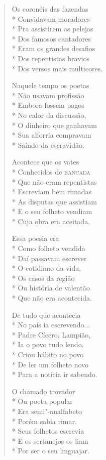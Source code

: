 \begin{verse}
Os coronéis das fazendas\\*
Convidavam moradores\\*
Pra assistirem as pelejas\\*
Dos famosos cantadores\\*
Eram os grandes desafios\\*
Dos repentistas bravios\\*
Dos versos mais multicores.

Naquele tempo os poetas\\*
Não usavam profissão\\*
Embora fossem pagos\\*
No calor da discussão,\\*
O dinheiro que ganhavam\\*
Sua alforria compravam\\*
Saindo da escravidão.

Acontece que os vates\\*
Conhecidos de \textsc{bancada}\\*
Que não eram repentistas\\*
Escreviam bem rimadas\\*
As disputas que assistiam\\*
E o seu folheto vendiam\\*
Cuja obra era aceitada.

Essa poesia era\\*
Como folheto vendida\\*
Daí passavam escrever\\*
O cotidiano da vida,\\*
Os casos da região\\*
Ou história de valentão\\*
Que não era acontecida.

De tudo que acontecia\\*
No país ia escrevendo...\\*
Padre Cícero, Lampião,\\*
Ia o povo tudo lendo.\\*
Criou hábito no povo\\*
De ler um folheto novo\\*
Para a notícia ir sabendo.

O chamado trovador\\*
Ou poeta popular\\*
Era semi"-analfabeto\\*
Porém sabia rimar,\\*
Seus folhetos escrevia\\*
E os sertanejos os liam\\*
Por ser o seu linguajar.


\end{verse}
